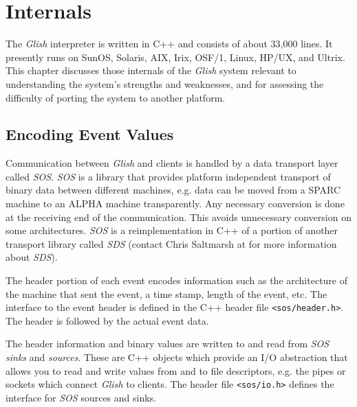 
\chapter{Internals}
\label{internals}
\begin{sloppy}

The {\em Glish} interpreter is written in C++ and consists of about
33,000 lines.
It presently runs on SunOS, Solaris, AIX, Irix, OSF/1, Linux, HP/UX,
and Ultrix. This chapter discusses those internals of the {\em Glish} system
relevant to understanding the system's strengths and weaknesses, and for
assessing the difficulty of porting the system to another platform.

\section{Encoding Event Values}
\label{encoding-events}

Communication between {\em Glish} and clients is handled by a data transport layer
called {\em SOS}. {\em SOS} is a library that provides platform independent transport
of binary data between different machines, e.g. data can be moved from a SPARC machine
to an ALPHA machine transparently. Any necessary conversion is done at the receiving end
of the communication. This avoids unnecessary conversion on some architectures. {\em SOS}
is a reimplementation in C++ of a portion of another transport library called {\em SDS}
(contact Chris Saltmarsh at 
for more information about {\em SDS}).

The header portion of each event encodes information such as the architecture of the
machine that sent the event, a time stamp, length of the event, etc. The interface
to the event header is defined in the C++ header file \verb+<sos/header.h>+. The
header is followed by the actual event data.

The header information and binary values are written to and read from {\em SOS}
{\em sinks} and {\em sources}. These are C++ objects which provide an I/O abstraction
that allows you to read and write values from and to file descriptors, e.g. the
pipes or sockets which connect {\em Glish} to clients. The header file \verb+<sos/io.h>+
defines the interface for {\em SOS} sources and sinks.


\end{sloppy}
